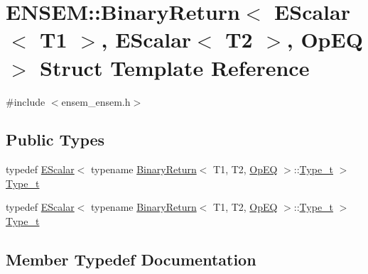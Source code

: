 \hypertarget{structENSEM_1_1BinaryReturn_3_01EScalar_3_01T1_01_4_00_01EScalar_3_01T2_01_4_00_01OpEQ_01_4}{}\section{E\+N\+S\+EM\+:\+:Binary\+Return$<$ E\+Scalar$<$ T1 $>$, E\+Scalar$<$ T2 $>$, Op\+EQ $>$ Struct Template Reference}
\label{structENSEM_1_1BinaryReturn_3_01EScalar_3_01T1_01_4_00_01EScalar_3_01T2_01_4_00_01OpEQ_01_4}


{\ttfamily \#include $<$ensem\+\_\+ensem.\+h$>$}

\subsection*{Public Types}
\begin{DoxyCompactItemize}
\item 
typedef \mbox{\hyperlink{classENSEM_1_1EScalar}{E\+Scalar}}$<$ typename \mbox{\hyperlink{structENSEM_1_1BinaryReturn}{Binary\+Return}}$<$ T1, T2, \mbox{\hyperlink{structENSEM_1_1OpEQ}{Op\+EQ}} $>$\+::\mbox{\hyperlink{structENSEM_1_1BinaryReturn_3_01EScalar_3_01T1_01_4_00_01EScalar_3_01T2_01_4_00_01OpEQ_01_4_aa48d91b27d47338f959b3a78b8c2ed42}{Type\+\_\+t}} $>$ \mbox{\hyperlink{structENSEM_1_1BinaryReturn_3_01EScalar_3_01T1_01_4_00_01EScalar_3_01T2_01_4_00_01OpEQ_01_4_aa48d91b27d47338f959b3a78b8c2ed42}{Type\+\_\+t}}
\item 
typedef \mbox{\hyperlink{classENSEM_1_1EScalar}{E\+Scalar}}$<$ typename \mbox{\hyperlink{structENSEM_1_1BinaryReturn}{Binary\+Return}}$<$ T1, T2, \mbox{\hyperlink{structENSEM_1_1OpEQ}{Op\+EQ}} $>$\+::\mbox{\hyperlink{structENSEM_1_1BinaryReturn_3_01EScalar_3_01T1_01_4_00_01EScalar_3_01T2_01_4_00_01OpEQ_01_4_aa48d91b27d47338f959b3a78b8c2ed42}{Type\+\_\+t}} $>$ \mbox{\hyperlink{structENSEM_1_1BinaryReturn_3_01EScalar_3_01T1_01_4_00_01EScalar_3_01T2_01_4_00_01OpEQ_01_4_aa48d91b27d47338f959b3a78b8c2ed42}{Type\+\_\+t}}
\end{DoxyCompactItemize}


\subsection{Member Typedef Documentation}
\mbox{\label{structENSEM_1_1BinaryReturn_3_01EScalar_3_01T1_01_4_00_01EScalar_3_01T2_01_4_00_01OpEQ_01_4_aa48d91b27d47338f959b3a78b8c2ed42}} 
